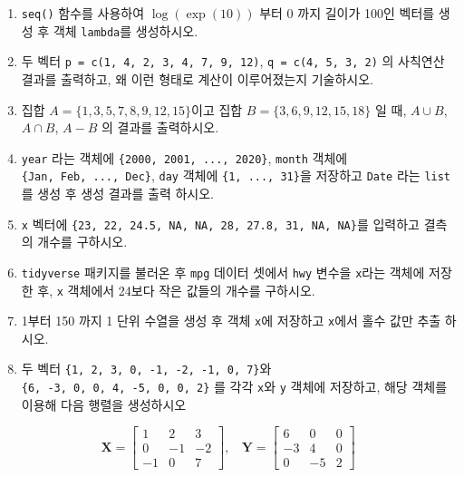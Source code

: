\documentclass[
  11pt,
]{krantz}
\begin{document}
\begin{enumerate}
\def\labelenumi{\arabic{enumi}.}
\item
  \texttt{seq()} 함수를 사용하여 \(\log(\exp(10))\) 부터 0 까지 길이가 100인 벡터를 생성 후 객체 \texttt{lambda}를 생성하시오.
\item
  두 벡터 \texttt{p\ =\ c(1,\ 4,\ 2,\ 3,\ 4,\ 7,\ 9,\ 12)}, \texttt{q\ =\ c(4,\ 5,\ 3,\ 2)} 의 사칙연산 결과를 출력하고, 왜 이런 형태로 계산이 이루어졌는지 기술하시오.
\item
  집합 \(A = \{1, 3, 5, 7, 8, 9, 12, 15 \}\)이고 집합 \(B = \{3, 6, 9, 12, 15, 18\}\) 일 때, \(A\cup B\), \(A \cap B\), \(A - B\) 의 결과를 출력하시오.
\item
  \texttt{year} 라는 객체에 \texttt{\{2000,\ 2001,\ ...,\ 2020\}}, \texttt{month} 객체에 \texttt{\{Jan,\ Feb,\ ...,\ Dec\}}, \texttt{day} 객체에 \texttt{\{1,\ ...,\ 31\}}을 저장하고 \texttt{Date} 라는 \texttt{list}를 생성 후 생성 결과를 출력 하시오.
\item
  \texttt{x} 벡터에 \texttt{\{23,\ 22,\ 24.5,\ NA,\ NA,\ 28,\ 27.8,\ 31,\ NA,\ NA\}}를 입력하고 결측의 개수를 구하시오.
\item
  \texttt{tidyverse} 패키지를 불러온 후 \texttt{mpg} 데이터 셋에서 \texttt{hwy} 변수을 \texttt{x}라는 객체에 저장한 후, \texttt{x} 객체에서 24보다 작은 값들의 개수를 구하시오.
\item
  1부터 150 까지 1 단위 수열을 생성 후 객체 \texttt{x}에 저장하고 \texttt{x}에서 홀수 값만 추출 하시오.
\item
  두 벡터 \texttt{\{1,\ 2,\ 3,\ 0,\ -1,\ -2,\ -1,\ 0,\ 7\}}와 \texttt{\{6,\ -3,\ 0,\ 0,\ 4,\ -5,\ 0,\ 0,\ 2\}} 를 각각 \texttt{x}와 \texttt{y} 객체에 저장하고, 해당 객체를 이용해 다음 행렬을 생성하시오
\end{enumerate}

\[\mathrm{\mathbf{X}} = 
\begin{bmatrix}
1   &  2 & 3 \\
0   & -1 & -2 \\
-1  &  0 &  7
\end{bmatrix}, ~~~~
\mathrm{\mathbf{Y}} = 
\begin{bmatrix}
6  & 0 & 0 \\
-3 & 4 & 0 \\
0  &-5 & 2
\end{bmatrix}
\]
\end{document}
